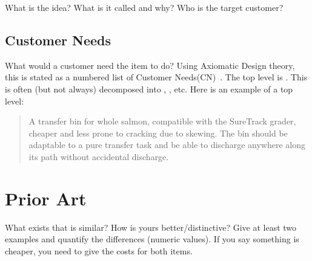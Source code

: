 \documentclass[sn-mathphys]{sn-jnl}%
\theoremstyle{thmstyleone}%
\theoremstyle{thmstyletwo}%
\theoremstyle{thmstylethree}%
\begin{document}
What is the idea?  What is it called and why?
Who is the target customer?



\subsection{Customer Needs}\label{sec:customer-needs}
What would a customer need the item to do?  
Using Axiomatic Design theory, this is stated as a numbered list of Customer Needs(CN)~\cite{suh1990principles}.
The top level is .
This is often (but not always) decomposed into , , etc.
Here is an example of a top level:

\begin{quote} \textbf{} A transfer bin for whole salmon, compatible with the SureTrack grader, cheaper and less prone to cracking due to skewing.  
The bin should be adaptable to a pure transfer task and be able to discharge anywhere along its path without
accidental discharge.~\cite{gerhard2016suretrack}
\end{quote}


\section{Prior Art}\label{sec:prior-art}
What exists that is similar?  How is yours better/distinctive?
Give at least two examples and quantify the differences (numeric values).
If you say something is cheaper, you need to give the costs for both items.
\end{document}
